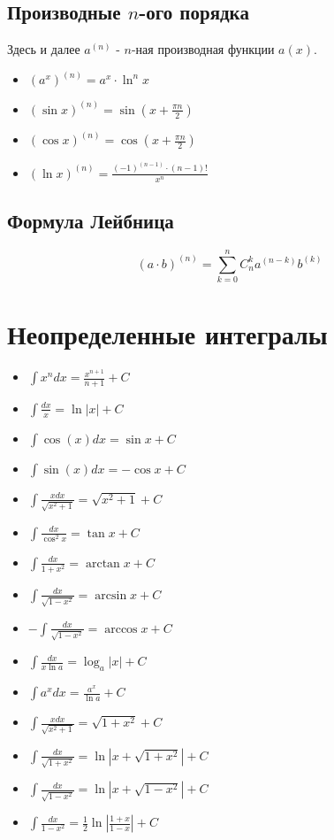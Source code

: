 \documentclass{article}
\begin{document}
	\subsection{Производные $n$-ого порядка}
	Здесь и далее $a^{(n)}$ - $n$-ная производная функции $a(x)$.
	\begin{itemize}
		\item $(a^x)^{(n)}=a^x \cdot \ln^n{x} $
		\item $(\sin{x})^{(n)}=\sin{(x+\frac{\pi n}{2})}$
		\item $(\cos{x})^{(n)}=\cos{(x+\frac{\pi n}{2})}$
		\item $(\ln{x})^{(n)}=\frac{(-1)^{(n-1)}\cdot (n-1)!}{x^n}$
	\end{itemize}
	\subsection{Формула Лейбница}
	$$(a\cdot b)^{(n)}=\sum_{k=0}^n C^k_na^{(n-k)}b^{(k)}$$
	
	\section{Неопределенные интегралы}
	\begin{itemize}
		\item $\int{x^ndx}=\frac{x^{n+1}}{n+1}+C$
		\item $\int \frac{dx}{x} = \ln{|x|} + C$
		\item $\int{\cos{(x)}}dx = \sin{x} + C$
		\item $\int{\sin{(x)}}dx = - \cos{x} + C$
		\item $\int{\frac{xdx}{\sqrt{x^2+1}}} = \sqrt{x^2+1}+C$
		\item $\int\frac{dx}{\cos^2{x}} = \tan{x} +C$
		\item $\int\frac{dx}{1+x^2}=\arctan{x} +C$
		\item $\int\frac{dx}{\sqrt{1-x^2}} = \arcsin x +C$
		\item $-\int\frac{dx}{\sqrt{1-x^2}} = \arccos x +C$
		\item $\int\frac{dx}{x\ln{a}} = \log_a{|x|}+C$                                                                                                     
		\item $\int a^x dx= \frac{a^x}{\ln{a}}+C$
		\item $\int\frac{x dx}{\sqrt{x^2+1}} = \sqrt{1+x^2}+C$
		\item $\int\frac{dx}{\sqrt{1+x^2}} = \ln|x+\sqrt{1+x^2}|+C$
		\item $\int\frac{dx}{\sqrt{1-x^2}} = \ln|x+\sqrt{1-x^2}|+C$

		\item $\int\frac{dx}{1-x^2} = \frac{1}{2}\ln\left|\frac{1+x}{1-x}\right| + C $

	\end{itemize}

	
\end{document}
